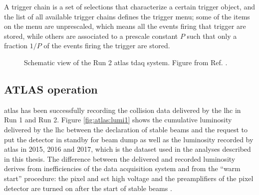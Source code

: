 A trigger chain is a set of selections that characterize a certain trigger object, and the list of all available trigger chains defines the trigger menu; some of the items on the menu are unprescaled, which means all the events firing that trigger are stored, while others are associated to a prescale constant $P$ such that only a fraction $1/P$ of the events firing the trigger are stored.

\begin{figure}[ht]
\centering
{}
\caption{Schematic view of the Run 2 \gls{atlas} \gls{tdaq} system. Figure from Ref. \cite{Aaboud:2016leb}.}
\label{fig:atlas:trig}
\end{figure}


\subsection{ATLAS operation}

\gls{atlas} has been successfully recording the collision data delivered by the \gls{lhc} in Run 1 and Run 2. Figure \ref{fig:atlas:lumi1} shows the cumulative luminosity delivered by the \gls{lhc} between the declaration of stable beams and the request to put the detector in standby for beam dump  as well as the luminosity recorded by \gls{atlas} in 2015, 2016 and 2017, which is the dataset used in the analyses described in this thesis. The difference between the delivered and recorded luminosity derives from inefficiencies of the data acquisition system and from the ``warm start'' procedure: 
the pixel and \gls{sct} high voltage and the preamplifiers of the pixel detector are turned on after the start of stable beams \cite{LumiTwiki}.


